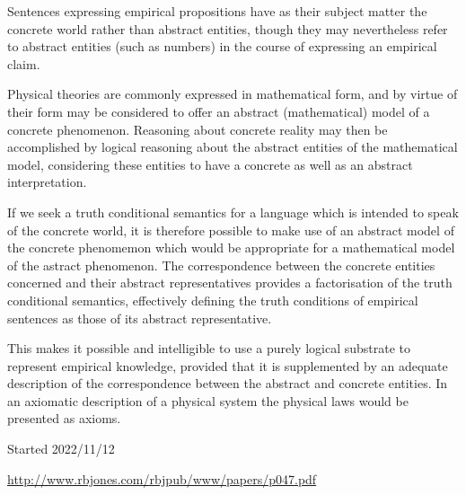 \documentclass[10pt,titlepage]{article}
\newcommand{\ignore}[1]{}
\begin{document}
Sentences expressing empirical propositions have as their subject matter the concrete world rather than abstract entities, though they may nevertheless refer to abstract entities (such as numbers) in the course of expressing an empirical claim.

Physical theories are commonly expressed in mathematical form, and by virtue of their form may be considered to offer an abstract (mathematical) model of a concrete phenomenon.
Reasoning about concrete reality may then be accomplished by logical reasoning about the abstract entities of the mathematical model, considering these entities to have a concrete as well as an abstract interpretation.

If we seek a truth conditional semantics for a language which is intended to speak of the concrete world, it is therefore possible to make use of an abstract model of the concrete phenomemon which would be appropriate for a mathematical model of the astract phenomenon.
The correspondence between the concrete entities concerned and their abstract representatives provides a factorisation of the truth conditional semantics, effectively defining the truth conditions of empirical sentences as those of its abstract representative.

This makes it possible and intelligible to use a purely logical substrate to represent empirical knowledge, provided that it is supplemented by an adequate description of the correspondence between the abstract and concrete entities.
In an axiomatic description of a physical system the physical laws would be presented as axioms.






\ignore{
\begin{quote}
``Matters of fact, which are the second objects of human reason, are not ascertained in the same manner; nor is our evidence of their truth, however great, of a like nature with the foregoing. The contrary of every matter of fact is still possible; because it can never imply a contradiction, and is conceived by the mind with the same facility and distinctness, as if ever so conformable to reality. That the sun will not rise to-morrow is no less intelligible a proposition, and implies no more contradiction than the affirmation, that it will rise. We should in vain, therefore, attempt to demonstrate its falsehood. Were it demonstratively false, it would imply a contradiction, and could never be distinctly conceived by the mind.''
\end{quote}
}%

\appendix
\pagebreak
{}
{}



\label{index}
{\twocolumn[]
{\small\printindex}}

\vfill

\tiny{
Started 2022/11/12

\href{http://www.rbjones.com/rbjpub/www/papers/p047.pdf}{http://www.rbjones.com/rbjpub/www/papers/p047.pdf}

}%
\end{document}
